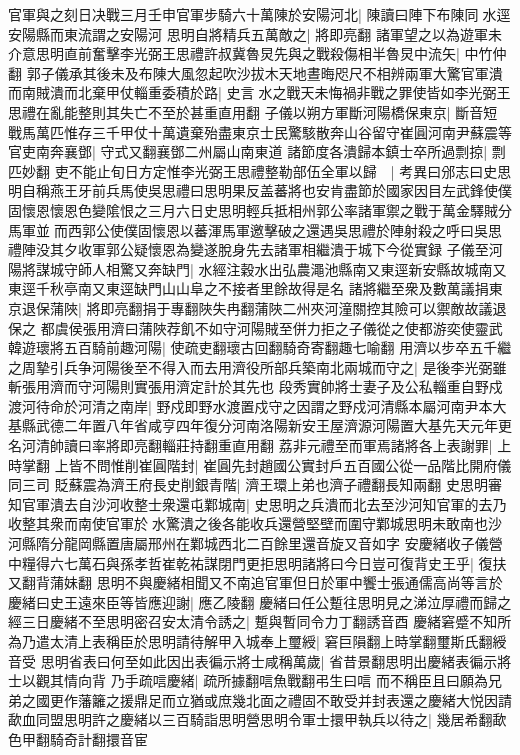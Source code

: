 官軍與之刻日决戰三月壬申官軍步騎六十萬陳於安陽河北|{
	陳讀曰陣下布陳同水逕安陽縣而東流謂之安陽河}
思明自將精兵五萬敵之|{
	將即亮翻}
諸軍望之以為遊軍未介意思明直前奮擊李光弼王思禮許叔冀魯炅先與之戰殺傷相半魯炅中流矢|{
	中竹仲翻}
郭子儀承其後未及布陳大風忽起吹沙拔木天地晝晦咫尺不相辨兩軍大驚官軍潰而南賊潰而北棄甲仗輜重委積於路|{
	史言水之戰天未悔禍非戰之罪使皆如李光弼王思禮在亂能整則其失亡不至於甚重直用翻}
子儀以朔方軍斷河陽橋保東京|{
	斷音短}
戰馬萬匹惟存三千甲仗十萬遺棄殆盡東京士民驚駭散奔山谷留守崔圓河南尹蘇震等官吏南奔襄鄧|{
	守式又翻襄鄧二州屬山南東道}
諸節度各潰歸本鎮士卒所過剽掠|{
	剽匹妙翻}
吏不能止旬日方定惟李光弼王思禮整勒部伍全軍以歸　|{
	考異曰邠志曰史思明自稱燕王牙前兵馬使吳思禮曰思明果反盖蕃將也安肯盡節於國家因目左武鋒使僕固懷恩懷恩色變隂恨之三月六日史思明輕兵抵相州郭公率諸軍禦之戰于萬金驛賊分馬軍並而西郭公使僕固懷恩以蕃渾馬軍邀擊破之還遇吳思禮於陣射殺之呼曰吳思禮陣没其夕收軍郭公疑懷恩為變遂脫身先去諸軍相繼潰于城下今從實録}
子儀至河陽將謀城守師人相驚又奔缺門|{
	水經注穀水出弘農澠池縣南又東逕新安縣故城南又東逕千秋亭南又東逕缺門山山阜之不接者里餘故得是名}
諸將繼至衆及數萬議捐東京退保蒲陜|{
	將即亮翻捐于專翻陜失冉翻蒲陜二州夾河潼關控其險可以禦敵故議退保之}
都虞侯張用濟曰蒲陜荐飢不如守河陽賊至併力拒之子儀從之使都游奕使靈武韓遊瓌將五百騎前趣河陽|{
	使疏吏翻瓌古回翻騎奇寄翻趣七喻翻}
用濟以步卒五千繼之周摯引兵争河陽後至不得入而去用濟役所部兵築南北兩城而守之|{
	是後李光弼雖斬張用濟而守河陽則實張用濟定計於其先也}
段秀實帥將士妻子及公私輜重自野戍渡河待命於河清之南岸|{
	野戍即野水渡置戍守之因謂之野戍河清縣本屬河南尹本大基縣武德二年置八年省咸亨四年復分河南洛陽新安王屋濟源河陽置大基先天元年更名河清帥讀曰率將即亮翻輜莊持翻重直用翻}
荔非元禮至而軍焉諸將各上表謝罪|{
	上時掌翻}
上皆不問惟削崔圓階封|{
	崔圓先封趙國公實封戶五百國公從一品階比開府儀同三司}
貶蘇震為濟王府長史削銀青階|{
	濟王環上弟也濟子禮翻長知兩翻}
史思明審知官軍潰去自沙河收整士衆還屯鄴城南|{
	史思明之兵潰而北去至沙河知官軍的去乃收整其衆而南使官軍於水驚潰之後各能收兵還營堅壁而圍守鄴城思明未敢南也沙河縣隋分龍岡縣置唐屬邢州在鄴城西北二百餘里還音旋又音如字}
安慶緒收子儀營中糧得六七萬石與孫孝哲崔乾祐謀閉門更拒思明諸將曰今日豈可復背史王乎|{
	復扶又翻背蒲妹翻}
思明不與慶緒相聞又不南追官軍但日於軍中饗士張通儒高尚等言於慶緒曰史王遠來臣等皆應迎謝|{
	應乙陵翻}
慶緒曰任公蹔往思明見之涕泣厚禮而歸之經三日慶緒不至思明密召安太清令誘之|{
	蹔與暫同令力丁翻誘音酉}
慶緒窘蹙不知所為乃遣太清上表稱臣於思明請待解甲入城奉上璽綬|{
	窘巨隕翻上時掌翻璽斯氏翻綬音受}
思明省表曰何至如此因出表徧示將士咸稱萬歲|{
	省昔景翻思明出慶緒表徧示將士以觀其情向背}
乃手疏唁慶緒|{
	疏所據翻唁魚戰翻弔生曰唁}
而不稱臣且曰願為兄弟之國更作藩籬之援鼎足而立猶或庶幾北面之禮固不敢受并封表還之慶緒大悦因請歃血同盟思明許之慶緒以三百騎詣思明營思明令軍士擐甲執兵以待之|{
	幾居希翻歃色甲翻騎奇計翻擐音宦}
